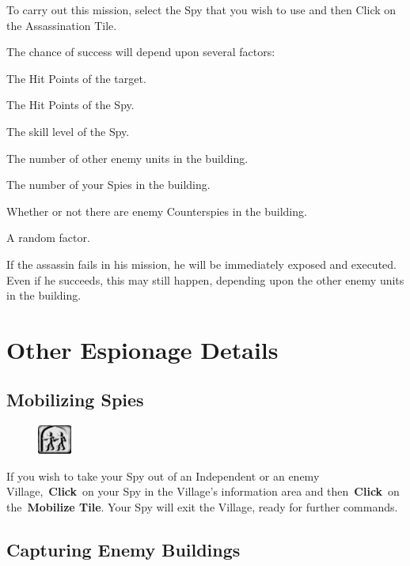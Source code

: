 To carry out this mission, select the Spy that you wish to use and then Click on the Assassination Tile.

\begin{adjustwidth}{1cm}{}
The chance of success will depend upon several factors:

The Hit Points of the target.

The Hit Points of the Spy.

The skill level of the Spy.

The number of other enemy units in the building.

The number of your Spies in the building.

Whether or not there are enemy Counterspies in the building.

A random factor.
\end{adjustwidth}

If the assassin fails in his mission, he will be immediately exposed and executed. Even if he succeeds, this may still happen, depending upon the other enemy units in the building.

\section{Other Espionage Details}

\subsection{Mobilizing Spies}

\begin{figure}
	\vspace{-20pt}
	\begin{center}
		\includegraphics[width=0.1\textwidth]{Tmobilize}
	\end{center}
	\vspace{-20pt}
\end{figure}

If you wish to take your Spy out of an Independent or an enemy Village, \textbf{Click} on your Spy in the Village’s information area and then \textbf{Click} on the \textbf{Mobilize Tile}. Your Spy will exit the Village, ready for further commands.

\subsection{Capturing Enemy Buildings}

